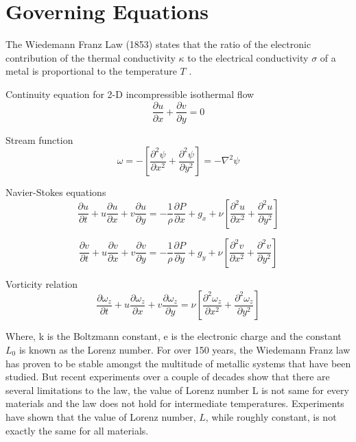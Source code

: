 \documentclass{article}
\begin{document}
\section{Governing Equations}
The Wiedemann Franz Law (1853) states that the ratio of the electronic contribution of the thermal conductivity $\kappa$ to the electrical conductivity $\sigma$ of a metal is proportional to the temperature $ T $ . \citep{Ashcroft}

Continuity equation for 2-D incompressible isothermal flow
\begin{equation}
\label{eqn:continuityEqn}
\frac{\partial u}{\partial x} + \frac{\partial v}{\partial y} = 0  
\end{equation}

Stream function 
\begin{equation}
\label{eqn:streamFnEqn}
\omega = -\left[\frac{\partial^2 \psi}{\partial x^2} +  \frac{\partial^2 \psi}{\partial y^2}\right]=-\nabla^2 \psi
\end{equation}

Navier-Stokes equations
\begin{equation}
\frac{\partial u}{\partial t} + u\frac{\partial u}{\partial x} + v\frac{\partial u}{\partial y}= -\frac{1}{\rho}\frac{\partial P}{\partial x} + g_x + \nu \left [ \frac{\partial^2 u}{\partial x^2} +  \frac{\partial^2 u}{\partial y^2} \right ]
\end{equation}

\begin{equation}
\frac{\partial v}{\partial t} + u\frac{\partial v}{\partial x} + v\frac{\partial v}{\partial y}= -\frac{1}{\rho}\frac{\partial P}{\partial y} + g_y + \nu \left [ \frac{\partial^2 v}{\partial x^2} +  \frac{\partial^2 v}{\partial y^2} \right ]
\end{equation}

Vorticity relation 
\begin{equation}
\label{eqn:vorticityFnEqn}
\frac{\partial \omega_z}{\partial t} + u\frac{\partial \omega_z}{\partial x} + v\frac{\partial \omega_z}{\partial y}= \nu \left [ \frac{\partial^2 \omega_z}{\partial x^2} +  \frac{\partial^2 \omega_z}{\partial y^2} \right ]
\end{equation}

Where, k is the Boltzmann constant, e is the electronic charge and the constant $L_0$ is  known as the Lorenz number.
For over 150 years, the Wiedemann Franz law has proven to be stable amongst the multitude of metallic systems that have been studied. 
But recent experiments over a couple of decades show that there are several limitations to the law, the value of Lorenz number L is not same for every materials and the law does not hold for intermediate temperatures. Experiments have shown that the value of Lorenz number, $L$, while roughly constant, is not exactly the same for all materials. 
 \citep{Bristol,2017Sci...355..371L} 
\end{document}
